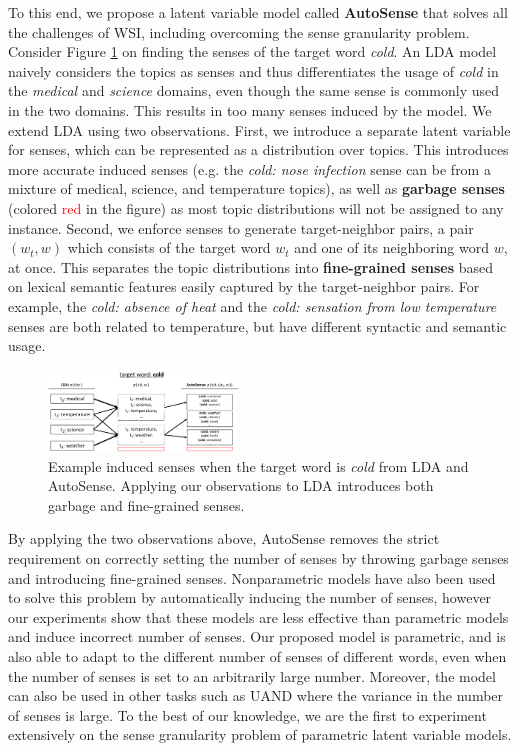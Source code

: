 \documentclass[letterpaper]{article}
\begin{document}
To this end, we propose a latent variable model called \textbf{AutoSense} that solves all the challenges of WSI, including overcoming the sense granularity problem. Consider Figure \ref{fig:intuition} on finding the senses of the target word \textit{cold}. An LDA model naively considers the topics as senses and thus differentiates the usage of \textit{cold} in the \textit{medical} and \textit{science} domains, even though the same sense is commonly used in the two domains. This results in too many senses induced by the model. We extend LDA using two observations. First, we introduce a separate latent variable for senses, which can be represented as a distribution over topics. This introduces more accurate induced senses (e.g. the \textit{cold: nose infection} sense can be from a mixture of medical, science, and temperature topics), as well as \textbf{garbage senses} (colored \textcolor{red}{red} in the figure) as most topic distributions will not be assigned to any instance. Second, we enforce senses to generate target-neighbor pairs, a pair $(w_t, w)$ which consists of the target word $w_t$ and one of its neighboring word $w$, at once. This separates the topic distributions into \textbf{fine-grained senses} based on lexical semantic features easily captured by the target-neighbor pairs. For example, the \textit{cold: absence of heat} and the \textit{cold: sensation from low temperature} senses are both related to temperature, but have different syntactic and semantic usage.

\begin{figure}
	\centering
	\includegraphics[width=0.45\textwidth]{intro}
	\caption{Example induced senses when the target word is \textit{cold} from LDA and AutoSense. Applying our observations to LDA introduces both garbage and fine-grained senses.}
	\label{fig:intuition}
\end{figure}

By applying the two observations above, AutoSense removes the strict requirement on correctly setting the number of senses by throwing garbage senses and introducing fine-grained senses. Nonparametric models \cite{teh2004sharing,lau2013unimelb} have also been used to solve this problem by automatically inducing the number of senses, however our experiments show that these models are less effective than parametric models and induce incorrect number of senses. Our proposed model is parametric, and is also able to adapt to the different number of senses of different words, even when the number of senses is set to an arbitrarily large number. Moreover, the model can also be used in other tasks such as UAND where the variance in the number of senses is large. To the best of our knowledge, we are the first to experiment extensively on the sense granularity problem of parametric latent variable models.
\end{document}
